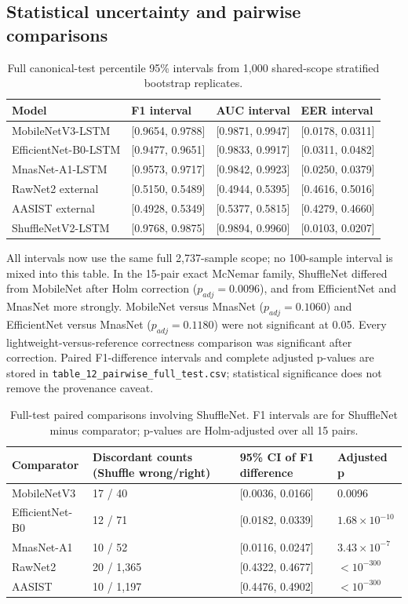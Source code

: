 \documentclass[10pt,journal,onecolumn]{IEEEtran}
\begin{document}
\subsection{Statistical uncertainty and pairwise comparisons}
\begin{table}[htbp]
\centering
\small
\caption{Full canonical-test percentile 95\% intervals from 1,000 shared-scope stratified bootstrap replicates.}
\label{tab:11}
\begin{tabularx}{\textwidth}{YYYY}
\toprule
Model & F1 interval & AUC interval & EER interval \\
\midrule
MobileNetV3-LSTM & [0.9654, 0.9788] & [0.9871, 0.9947] & [0.0178, 0.0311] \\
EfficientNet-B0-LSTM & [0.9477, 0.9651] & [0.9833, 0.9917] & [0.0311, 0.0482] \\
MnasNet-A1-LSTM & [0.9573, 0.9717] & [0.9842, 0.9923] & [0.0250, 0.0379] \\
RawNet2 external & [0.5150, 0.5489] & [0.4944, 0.5395] & [0.4616, 0.5016] \\
AASIST external & [0.4928, 0.5349] & [0.5377, 0.5815] & [0.4279, 0.4660] \\
ShuffleNetV2-LSTM & [0.9768, 0.9875] & [0.9894, 0.9960] & [0.0103, 0.0207] \\
\bottomrule
\end{tabularx}
\end{table}
All intervals now use the same full 2,737-sample scope; no 100-sample interval is mixed into this table. In the 15-pair exact McNemar family, ShuffleNet differed from MobileNet after Holm correction ($p_{adj}=0.0096$), and from EfficientNet and MnasNet more strongly. MobileNet versus MnasNet ($p_{adj}=0.1060$) and EfficientNet versus MnasNet ($p_{adj}=0.1180$) were not significant at 0.05. Every lightweight-versus-reference correctness comparison was significant after correction. Paired F1-difference intervals and complete adjusted p-values are stored in \texttt{table\_12\_pairwise\_full\_test.csv}; statistical significance does not remove the provenance caveat.

\begin{table}[htbp]
\centering
\small
\caption{Full-test paired comparisons involving ShuffleNet. F1 intervals are for ShuffleNet minus comparator; p-values are Holm-adjusted over all 15 pairs.}
\label{tab:12}
\begin{tabularx}{\textwidth}{YYYY}
\toprule
Comparator & Discordant counts (Shuffle wrong/right) & 95\% CI of F1 difference & Adjusted p \\
\midrule
MobileNetV3 & 17 / 40 & [0.0036, 0.0166] & 0.0096 \\
EfficientNet-B0 & 12 / 71 & [0.0182, 0.0339] & $1.68\times10^{-10}$ \\
MnasNet-A1 & 10 / 52 & [0.0116, 0.0247] & $3.43\times10^{-7}$ \\
RawNet2 & 20 / 1,365 & [0.4322, 0.4677] & $<10^{-300}$ \\
AASIST & 10 / 1,197 & [0.4476, 0.4902] & $<10^{-300}$ \\
\bottomrule
\end{tabularx}
\end{table}
\end{document}
